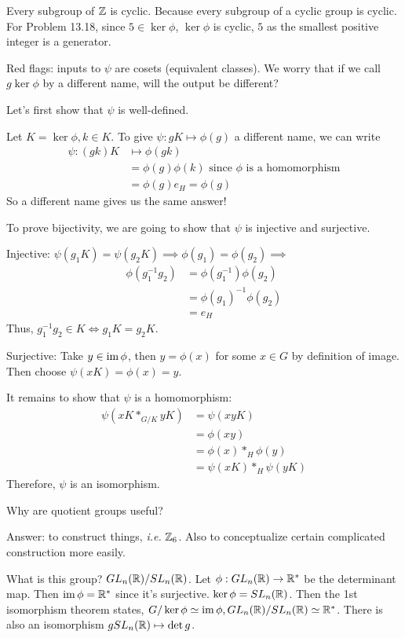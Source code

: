 \documentclass[class=article,crop=false]{standalone}
\begin{document}
Every subgroup of $ \mathbb{Z}$ is cyclic. Because every subgroup of a cyclic group is cyclic. For Problem 13.18, since $ 5 \in \ker \phi$, $ \ker \phi$ is cyclic, $ 5 $ as the smallest positive integer is a generator.

Red flags: inputs to $ \psi$ are cosets (equivalent classes). We worry that if we call  $ g \ker \phi$ by a different name, will the output be different?
\begin{prf}[FHT]
	Let's first show that $ \psi$ is well-defined.

Let $ K = \ker \phi, k \in K$. To give $ \psi: gK \mapsto \phi(g)  $ a different name, we can write
\begin{align*}
	\psi: (gk) K &\mapsto \phi(gk) \\
	&= \phi(g) \phi(k) \text{ since } \phi \text{ is a homomorphism}    \\
	&= \phi(g) e_H = \phi(g)  
\end{align*}
So a different name gives us the same answer! 

To prove bijectivity, we are going to show that $ \psi$ is injective and surjective.

Injective: $ \psi (g_1 K) = \psi(g_2 K) \implies \phi(g_1) = \phi(g_2) \implies$ 
\begin{align*}
	\phi(g_1^{-1} g_2) &= \phi(g_1^{-1}) \phi(g_2)\\ 
			   &= \phi(g_1)^{-1} \phi(g_2)\\ 
			   &= e_H
\end{align*}
Thus, $ g_1^{-1} g_2 \in K \iff g_1K=g_2K$.

Surjective: Take $ y \in \operatorname{im} \phi$, then $ y=\phi(x)$ for some $ x \in G$ by definition of image. Then choose $ \psi (xK) = \phi(x)= y $.

It remains to show that $ \psi$ is a homomorphism:
\begin{align*}
	\psi (xK *_{G / K} yK) &= \psi (xyK) \\
		       &= \phi(xy) \\
		       &= \phi(x) *_H \phi(y) \\
		       &= \psi(xK) *_H \psi(yK) 
\end{align*}
Therefore, $ \psi$ is an isomorphism.
\end{prf}

Why are quotient groups useful?

Answer: to construct things, \emph{i.e.} $ \mathbb{Z}_6$. Also to conceptualize certain complicated construction more easily.
\begin{eg}[]

What is this group?
$ GL_n ( \mathbb{R}) / SL_n( \mathbb{R})$. Let $ \phi: GL_n ( \mathbb{R}) \to \mathbb{R}^* $ be the determinant map. Then $ \operatorname{im} \phi = \mathbb{R}^* $ since it's surjective. $ \ker \phi = SL_n ( \mathbb{R})$. Then the 1st isomorphism theorem states, $ G / \ker \phi \simeq \operatorname{im} \phi, GL_n ( \mathbb{R}) / SL_n ( \mathbb{R}) \simeq \mathbb{R}^* $. There is also an isomorphism $ g SL_n ( \mathbb{R}) \mapsto \det g$.  
\end{eg}
\end{document}

